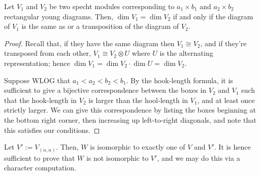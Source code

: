 \documentclass{amsart}
\begin{document}
\begin{proposition}
  Let $V_1$ and $V_2$ be two specht modules corresponding to $a_1 \times b_1$ and $a_2 \times b_2$ rectangular young diagrams.
  Then, $\dim V_1 = \dim V_2$ if and only if the diagram of $V_1$ is the same as or a transposition of the diagram of $V_2$.
\end{proposition}
\begin{proof}
  Recall that, if they have the same diagram then $V_1 \cong V_2$, and if they're transposed from each other, $V_1 \cong V_2 \otimes U$ where $U$ is the alternating representation;
  hence $\dim V_1 = \dim V_2 \cdot \dim U = \dim V_2$.

  Suppose WLOG that $a_1 < a_2 < b_2 < b_1$.
  By the hook-length formula, it is sufficient to give a bijective correspondence between the boxes in $V_2$ and $V_1$ such that the hook-length in $V_2$ is larger than the hool-length in $V_1$, and at least once strictly larger.
  We can give this correspondence by listing the boxes beginning at the bottom right corner, then increasing up left-to-right diagonals, and note that this satisfies our conditions.
\end{proof}

Let $V' := V_{(n,n)}$.
Then, $W$ is isomorphic to exactly one of $V$ and $V'$.
It is hence sufficient to prove that $W$ is not isomorphic to $V'$, and we may do this via a character computation.
\end{document}
